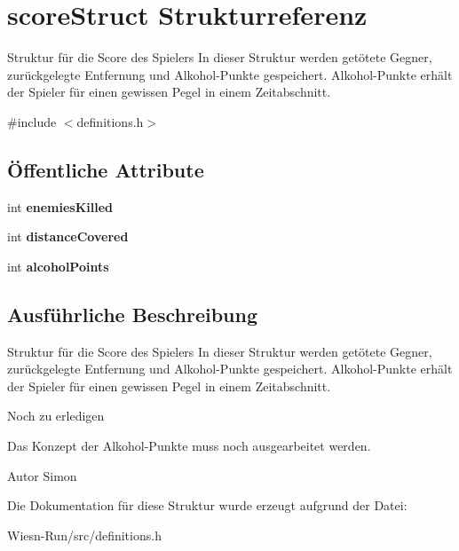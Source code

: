 \hypertarget{structscoreStruct}{\section{score\-Struct Strukturreferenz}
\label{structscoreStruct}
}


Struktur für die Score des Spielers In dieser Struktur werden getötete Gegner, zurückgelegte Entfernung und Alkohol-\/\-Punkte gespeichert. Alkohol-\/\-Punkte erhält der Spieler für einen gewissen Pegel in einem Zeitabschnitt.  




{\ttfamily \#include $<$definitions.\-h$>$}

\subsection*{Öffentliche Attribute}
\begin{DoxyCompactItemize}
\item 
\hypertarget{structscoreStruct_a3cdadeb4fdf40bca243d37c36889fe2e}{int {\bfseries enemies\-Killed}}\label{structscoreStruct_a3cdadeb4fdf40bca243d37c36889fe2e}

\item 
\hypertarget{structscoreStruct_a301f8f9d4fb3d201644031e850d1c626}{int {\bfseries distance\-Covered}}\label{structscoreStruct_a301f8f9d4fb3d201644031e850d1c626}

\item 
\hypertarget{structscoreStruct_ac611a7038a15af6bf71057574480af8c}{int {\bfseries alcohol\-Points}}\label{structscoreStruct_ac611a7038a15af6bf71057574480af8c}

\end{DoxyCompactItemize}


\subsection{Ausführliche Beschreibung}
Struktur für die Score des Spielers In dieser Struktur werden getötete Gegner, zurückgelegte Entfernung und Alkohol-\/\-Punkte gespeichert. Alkohol-\/\-Punkte erhält der Spieler für einen gewissen Pegel in einem Zeitabschnitt. 

\begin{DoxyRefDesc}{Noch zu erledigen}
\item[\hyperlink{todo__todo000001}{Noch zu erledigen}]Das Konzept der Alkohol-\/\-Punkte muss noch ausgearbeitet werden. \begin{DoxyAuthor}{Autor}
Simon 
\end{DoxyAuthor}
\end{DoxyRefDesc}


Die Dokumentation für diese Struktur wurde erzeugt aufgrund der Datei\-:\begin{DoxyCompactItemize}
\item 
Wiesn-\/\-Run/src/definitions.\-h\end{DoxyCompactItemize}

